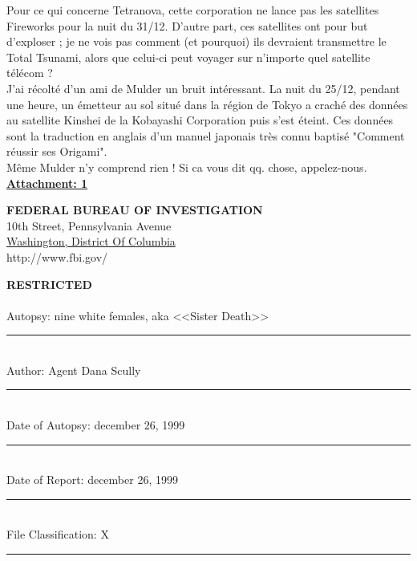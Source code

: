 \documentclass[11pt,twoside,a4paper]{book}
\begin{document}
Pour ce qui concerne Tetranova, cette corporation ne lance pas les satellites Fireworks pour la nuit du 31/12. D'autre part, ces satellites ont pour but d'exploser ; je ne vois pas comment (et pourquoi) ils devraient transmettre le Total Tsunami, alors que celui-ci peut voyager sur n'importe quel satellite t{\'e}l{\'e}com ? ~\\

J'ai r{\'e}colt{\'e} d'un ami de Mulder un bruit int{\'e}ressant. La nuit du 25/12, pendant une heure, un {\'e}metteur au sol situ{\'e} dans la r{\'e}gion de Tokyo a crach{\'e} des donn{\'e}es au satellite Kinshei de la Kobayashi Corporation puis s'est {\'e}teint. Ces donn{\'e}es sont la traduction en anglais d'un manuel japonais tr{\`e}s connu baptis{\'e} "Comment r{\'e}ussir ses Origami". ~\\

M{\^e}me Mulder n'y comprend rien ! Si ca vous dit qq. chose, appelez-nous. ~\\

\textbf{\underline{Attachment: 1} }

\clearpage


\begin{center}
\textbf{\Huge FEDERAL BUREAU OF INVESTIGATION}~\\
10th Street, Pennsylvania Avenue ~\\
\underline{Washington, District Of Columbia} ~\\
http://www.fbi.gov/ ~\\
\end{center}


\textbf{\LARGE RESTRICTED}~\\~\\
Autopsy: nine white females, aka <<Sister Death>>
\hrule~\\ %
Author: Agent Dana Scully
\hrule~\\ %
Date of Autopsy: december 26, 1999
\hrule~\\ %
Date of Report: december 26, 1999
\hrule~\\ %
File Classification: X
\hrule~\\ %
\end{document}
